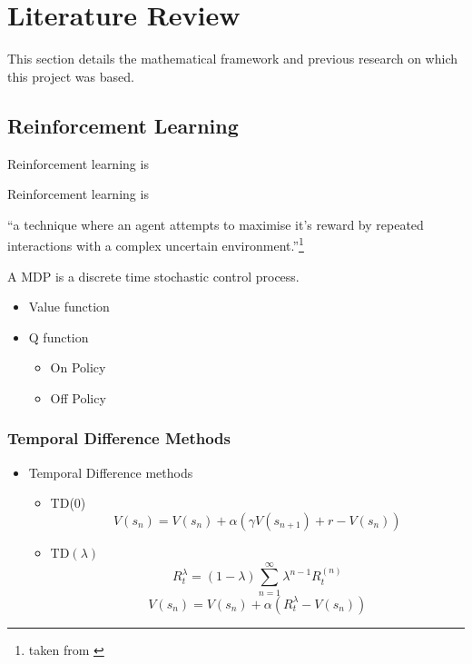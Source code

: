 \section{Literature Review}
This section details the mathematical framework and previous research on which this project was based.
\subsection{Reinforcement Learning}
Reinforcement learning is %

Reinforcement learning is

 ``a technique where an agent attempts to maximise it's reward by repeated interactions with a complex uncertain environment.''\footnote{taken from \cite{Sutton:1998:IRL:551283}}

A MDP is a discrete time stochastic control process.

\begin{figure}

\end{figure}

\begin{itemize}
\item Value function
\item Q function
\begin{itemize}
\item On Policy
\item Off Policy

\end{itemize}

\end{itemize}


\subsubsection{Temporal Difference Methods}
\begin{itemize}

\item Temporal Difference methods

\begin{itemize}
\item TD(0)
\begin{equation*}
V(s_n) = V(s_n) + \alpha ( \gamma V(s_{n+1}) + r - V(s_n) )
\end{equation*}
\item TD$(\lambda)$
\begin{equation*}
R_t^\lambda = (1 - \lambda) \sum_{n = 1}^\infty \lambda^{n-1} R_t^{(n)}
\end{equation*}
\begin{equation*}
V(s_n) = V(s_n) + \alpha ( R_t^\lambda - V(s_n) )
\end{equation*}

\end{itemize}
\end{itemize}



